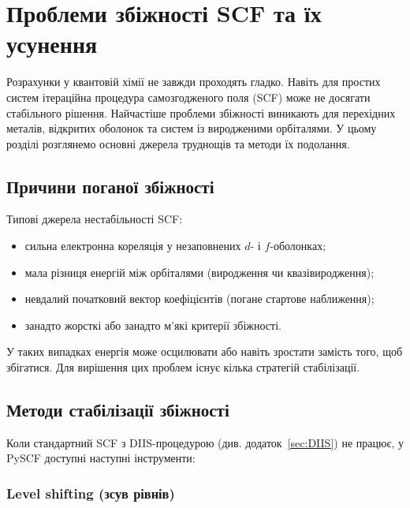

\section{Проблеми збіжності SCF та їх усунення}\label{sec:convergence}

Розрахунки у квантовій хімії не завжди проходять гладко. Навіть для простих систем ітераційна процедура самозгодженого поля (SCF) може не досягати стабільного рішення.
Найчастіше проблеми збіжності виникають для перехідних металів, відкритих оболонок та систем із виродженими орбіталями.
У цьому розділі розглянемо основні джерела труднощів та методи їх подолання.

\subsection{Причини поганої збіжності}

Типові джерела нестабільності SCF:
\begin{itemize}
  \item сильна електронна кореляція у незаповнених $d$- і $f$-оболонках;
  \item мала різниця енергій між орбіталями (виродження чи квазівиродження);
  \item невдалий початковий вектор коефіцієнтів (погане стартове наближення);
  \item занадто жорсткі або занадто м'які критерії збіжності.
\end{itemize}

У таких випадках енергія може осцилювати або навіть зростати замість того, щоб збігатися. Для вирішення цих проблем існує кілька стратегій стабілізації.

\subsection{Методи стабілізації збіжності}

Коли стандартний SCF з DIIS-процедурою (див. додаток~\ref{sec:DIIS}) не працює, у PySCF доступні наступні інструменти:

\subsubsection{Level shifting (зсув рівнів)}

